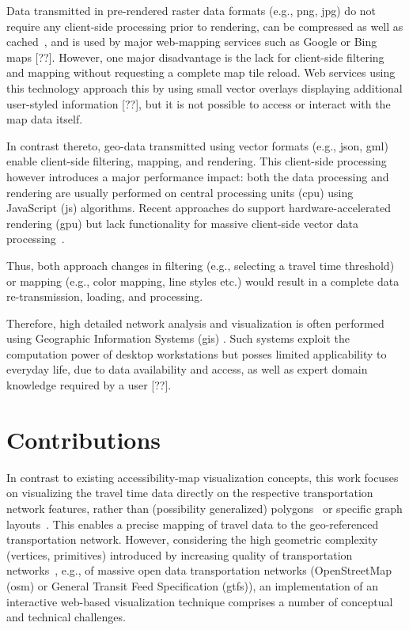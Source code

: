     Data transmitted in pre-rendered raster data formats (e.g., \acrshort{png},
    \acrshort{jpg}) do
    not require any client-side processing prior to rendering, can be compressed
    as well as cached~\cite{ESRI2006}, and is used by major web-mapping services
    such as Google or Bing maps [??]. However, one major disadvantage is the
    lack for client-side filtering and mapping without requesting a complete map
    tile reload. Web services using this technology approach this by using small
    vector overlays displaying additional user-styled information [??], but it
    is not possible to access or interact with the map data itself.\par

    In contrast thereto, geo-data transmitted using vector formats
    (e.g., \acrshort{json}, \acrshort{gml}) enable
    client-side filtering, mapping, and rendering. This client-side processing
    however introduces a major performance impact: both the data processing and
    rendering are usually performed on central processing units (\acrshort{cpu})
    using JavaScript (\acrshort{js}) algorithms. Recent approaches do support
    hardware-accelerated rendering (\acrshort{gpu}) but lack functionality for
    massive client-side vector data processing~\cite{Gaffuri2012}.\par

    Thus, both approach changes in filtering (e.g., selecting a travel time
    threshold) or mapping (e.g., color mapping, line styles etc.) would result
    in a complete data re-transmission, loading, and processing.\par

    Therefore, high detailed network analysis and visualization is often
    performed using Geographic Information Systems (\acrshort{gis})
    \cite{o2000using}. Such systems
    exploit the computation power of desktop workstations but posses limited
    applicability to everyday life, due to data availability and access, as well
    as expert domain knowledge required by a user [??].\par

  \section{Contributions}
    \label{sec:intro:contr}

    In contrast to existing accessibility-map visualization concepts, this work
    focuses on visualizing the travel time data directly on the respective
    transportation network features, rather than (possibility generalized)
    polygons~\cite{Glander2010} or specific graph layouts~\cite{Krause2012}.
    This enables a precise mapping of travel data to the geo-referenced
    transportation network. However, considering the high geometric complexity
    (vertices, primitives) introduced by increasing quality of transportation
    networks~\cite{Zielstra2010}, e.g., of massive open data transportation
    networks (OpenStreetMap (\acrshort{osm}) or General Transit Feed
    Specification (\acrshort{gtfs})),
    an implementation of an interactive web-based visualization technique
    comprises a number of conceptual and technical challenges.\par

